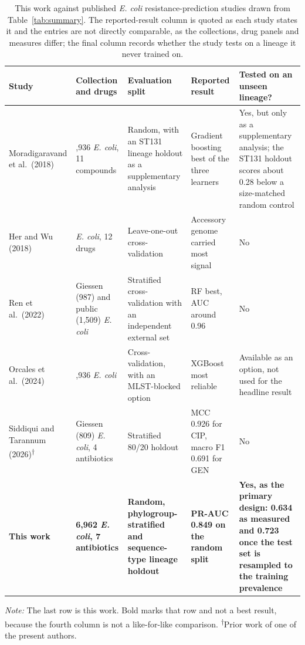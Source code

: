 \documentclass[journal]{IEEEtran}
\begin{document}
\begin{table}[!tb]
\caption{This work against published \textit{E. coli} resistance-prediction studies
drawn from Table~\ref{tab:summary}. The reported-result column is quoted as each
study states it and the entries are not directly comparable, as the collections,
drug panels and measures differ; the final column records whether the study tests
on a lineage it never trained on.}
\label{tab:sota}
\centering
\footnotesize
\setlength{\tabcolsep}{3pt}
\renewcommand{\arraystretch}{1.05}
\begin{tabular}{|>{\raggedright\arraybackslash}p{2.7cm}|>{\raggedright\arraybackslash}p{3.2cm}|>{\raggedright\arraybackslash}p{3.8cm}|>{\raggedright\arraybackslash}p{2.9cm}|>{\raggedright\arraybackslash}p{3.4cm}|}
\hline
\rowcolor{headgrey}
\textbf{Study} & \textbf{Collection and drugs} & \textbf{Evaluation split} & \textbf{Reported result} & \textbf{Tested on an unseen lineage?} \\ \hline
Moradigaravand et al.\ (2018) \cite{moradigaravand2018} & 1,936 \textit{E. coli}, 11 compounds & Random, with an ST131 lineage holdout as a supplementary analysis & Gradient boosting best of the three learners & Yes, but only as a supplementary analysis; the ST131 holdout scores about 0.28 below a size-matched random control \\ \hline
Her and Wu (2018) \cite{her2018pangenome} & 59 \textit{E. coli}, 12 drugs & Leave-one-out cross-validation & Accessory genome carried most signal & No \\ \hline
Ren et al.\ (2022) \cite{Ren2022} & Giessen (987) and public (1,509) \textit{E. coli} & Stratified cross-validation with an independent external set & RF best, AUC around 0.96 & No \\ \hline
Orcales et al.\ (2024) \cite{Orcales2024} & 1,936 \textit{E. coli} & Cross-validation, with an MLST-blocked option & XGBoost most reliable & Available as an option, not used for the headline result \\ \hline
Siddiqui and Tarannum (2026)\textsuperscript{$\dagger$} \cite{siddiqui2025amrensemble} & Giessen (809) \textit{E. coli}, 4 antibiotics & Stratified 80/20 holdout & MCC 0.926 for CIP, macro F1 0.691 for GEN & No \\ \hline
\rowcolor{oursblue}
\textbf{This work} & \textbf{6,962 \textit{E. coli}, 7 antibiotics} & \textbf{Random, phylogroup-stratified and sequence-type lineage holdout} & \textbf{PR-AUC 0.849 on the random split} & \textbf{Yes, as the primary design: 0.634 as measured and 0.723 once the test set is resampled to the training prevalence} \\ \hline
\end{tabular}
\renewcommand{\arraystretch}{1.0}
\vspace{0.4em}

\noindent\footnotesize\textit{Note:} The last row is this work. Bold marks that row
and not a best result, because the fourth column is not a like-for-like comparison.
\textsuperscript{$\dagger$}Prior work of one of the present authors.
\end{table}
\end{document}
